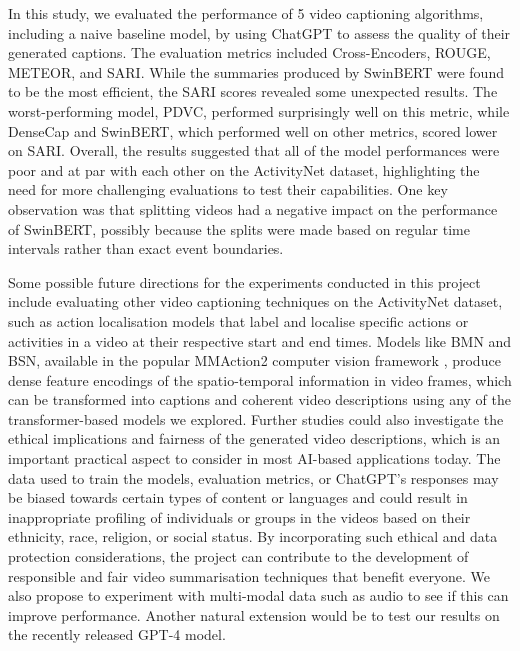 In this study, we evaluated the performance of 5 video captioning algorithms, including a naive baseline model, by using ChatGPT to assess the quality of their generated captions. The evaluation metrics included Cross-Encoders, ROUGE, METEOR, and SARI. While the summaries produced by SwinBERT were found to be the most efficient, the SARI scores revealed some unexpected results. The worst-performing model, PDVC, performed surprisingly well on this metric, while DenseCap and SwinBERT, which performed well on other metrics, scored lower on SARI. Overall, the results suggested that all of the model performances were poor and at par with each other on the ActivityNet dataset, highlighting the need for more challenging evaluations to test their capabilities. One key observation was that splitting videos had a negative impact on the performance of SwinBERT, possibly because the splits were made based on regular time intervals rather than exact event boundaries.

Some possible future directions for the experiments conducted in this project include evaluating other video captioning techniques on the ActivityNet dataset, such as action localisation models that label and localise specific actions or activities in a video at their respective start and end times. Models like BMN and BSN, available in the popular MMAction2 computer vision framework \cite{mmaction}, produce dense feature encodings of the spatio-temporal information in video frames, which can be transformed into captions and coherent video descriptions using any of the transformer-based models we explored. Further studies could also investigate the ethical implications and fairness of the generated video descriptions, which is an important practical aspect to consider in most AI-based applications today. The data used to train the models, evaluation metrics, or ChatGPT's responses may be biased towards certain types of content or languages and could result in inappropriate profiling of individuals or groups in the videos based on their ethnicity, race, religion, or social status. By incorporating such ethical and data protection considerations, the project can contribute to the development of responsible and fair video summarisation techniques that benefit everyone. We also propose to experiment with multi-modal data such as audio to see if this can improve performance. Another natural extension would be to test our results on the recently released GPT-4 model.